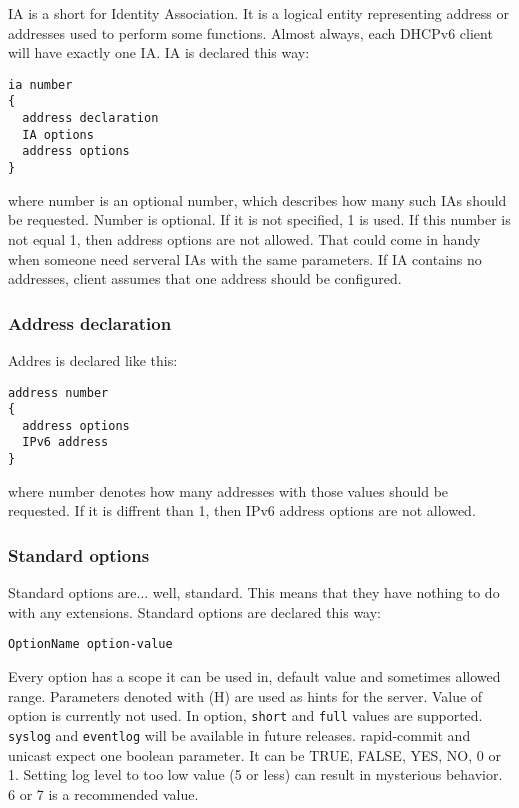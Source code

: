 IA is a short for Identity Association. It is a logical entity
representing address or addresses used to perform some
functions. Almost always, each DHCPv6 client will have exactly one
IA. IA is declared this way:

\begin{verbatim}
ia number
{ 
  address declaration
  IA options
  address options
}
\end{verbatim}

where number is an optional number, which describes how many such IAs
should be requested. Number is optional. If it is not specified, 1 is
used. If this number is not equal 1, then address
options are not allowed. That could come in handy when someone need
serveral IAs with the same parameters. If IA contains no addresses,
client assumes that one address should be configured.

\subsubsection{Address declaration}
Addres is declared like this:

\begin{verbatim}
address number
{ 
  address options
  IPv6 address
}
\end{verbatim}
where number denotes how many addresses with those values should be
requested. If it is diffrent than 1, then IPv6 address options are not
allowed.

\subsubsection{Standard options}
Standard options are... well, standard. This means that they have 
nothing to do with any extensions. Standard options are declared this way:

\begin{verbatim}
OptionName option-value
\end{verbatim}

Every option has a scope it can be used in, default value and
sometimes allowed range. Parameters denoted with (H) are used as hints
for the server. Value of  option is currently not
used. In  option, \verb+short+ and \verb+full+ values are
supported. \verb+syslog+ and \verb+eventlog+ will be available in
future releases. rapid-commit and unicast expect one boolean
parameter. It can be TRUE, FALSE, YES, NO, 0 or 1. Setting log level
to too low value (5 or less) can result in mysterious behavior. 6 or 7
is a recommended value.

